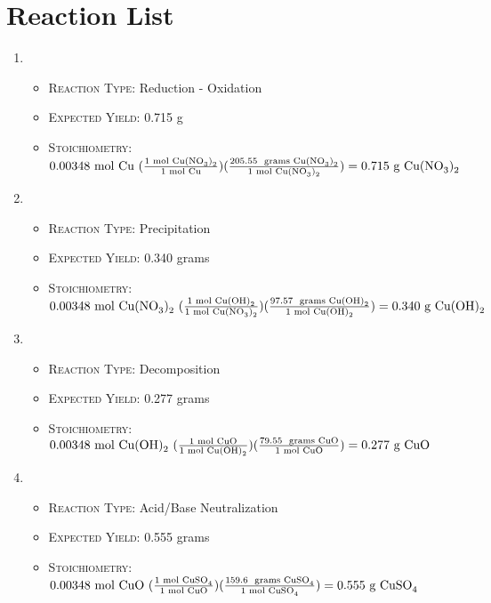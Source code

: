 \documentclass[11pt,letterpaper]{report}
\begin{document}
\section*{Reaction List}
\begin{enumerate}
\item {}
\begin{itemize}
\item \textsc{Reaction Type:} Reduction - Oxidation
\item \textsc{Expected Yield:} 0.715 g 
\item \textsc{Stoichiometry:} $0.00348 \text{ mol \ce{Cu} } ( \frac{\text{1 mol \ce{Cu(NO3)2}}}{\text{1 mol \ce{Cu}}} ) ( \frac{\text{205.55 \text{ grams} \ce{Cu(NO3)2}}}{\text{1 mol \ce{Cu(NO3)2}}} ) = 0.715 \text{ g \ce{Cu(NO3)2}}$
\end{itemize}
\item {}
\begin{itemize}
\item \textsc{Reaction Type:} Precipitation
\item \textsc{Expected Yield:} 0.340 grams
\item \textsc{Stoichiometry:} $0.00348 \text{ mol \ce{Cu(NO3)2} } ( \frac{\text{1 mol \ce{Cu(OH)2}}}{\text{1 mol \ce{Cu(NO3)2}}} ) ( \frac{\text{97.57 \text{ grams} \ce{Cu(OH)2}}}{\text{1 mol \ce{Cu(OH)2}}} ) = 0.340 \text{ g \ce{Cu(OH)2}}$
\end{itemize}
\item {}
\begin{itemize}
\item \textsc{Reaction Type:} Decomposition
\item \textsc{Expected Yield:} 0.277 grams
\item \textsc{Stoichiometry:} $0.00348 \text{ mol \ce{Cu(OH)2} } ( \frac{\text{1 mol \ce{CuO}}}{\text{1 mol \ce{Cu(OH)2}}} ) ( \frac{\text{79.55 \text{ grams} \ce{CuO}}}{\text{1 mol \ce{CuO}}} ) = 0.277 \text{ g \ce{CuO}}$
\end{itemize}
\item {}
\begin{itemize}
\item \textsc{Reaction Type:} Acid/Base Neutralization
\item \textsc{Expected Yield:} 0.555 grams
\item \textsc{Stoichiometry:} $0.00348 \text{ mol \ce{CuO} } ( \frac{\text{1 mol \ce{CuSO4}}}{\text{1 mol \ce{CuO}}} ) ( \frac{\text{159.6 \text{ grams} \ce{CuSO4}}}{\text{1 mol \ce{CuSO4}}} ) = 0.555 \text{ g \ce{CuSO4}}$

\end{itemize}
\end{enumerate}
\end{document}
